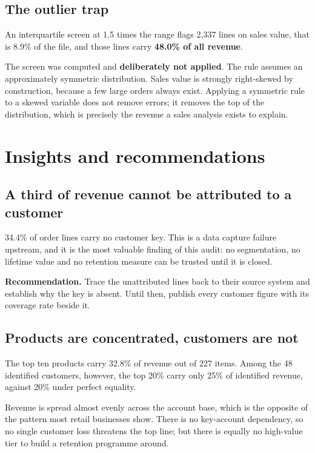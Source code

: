 \documentclass[11pt,a4paper]{article}
\begin{document}
\subsection{The outlier trap}

An interquartile screen at 1.5 times the range flags 2{,}337 lines on sales
value, that is 8.9\% of the file, and those lines carry
\textbf{48.0\% of all revenue}.

The screen was computed and \textbf{deliberately not applied}. The rule assumes an
approximately symmetric distribution. Sales value is strongly right-skewed by
construction, because a few large orders always exist. Applying a symmetric rule to a
skewed variable does not remove errors; it removes the top of the distribution, which is
precisely the revenue a sales analysis exists to explain.

\section{Insights and recommendations}

\subsection{A third of revenue cannot be attributed to a customer}

34.4\% of order lines carry no customer key. This is a data capture
failure upstream, and it is the most valuable finding of this audit: no segmentation, no
lifetime value and no retention measure can be trusted until it is closed.

\textbf{Recommendation.} Trace the unattributed lines back to their source system and
establish why the key is absent. Until then, publish every customer figure with its
coverage rate beside it.

\subsection{Products are concentrated, customers are not}

The top ten products carry 32.8\% of revenue out of 227 items.
Among the 48 identified customers, however, the top 20\% carry only
25\% of identified revenue, against 20\% under perfect equality.

Revenue is spread almost evenly across the account base, which is the opposite of the
pattern most retail businesses show. There is no key-account dependency, so no single
customer loss threatens the top line; but there is equally no high-value tier to build a
retention programme around.
\end{document}
